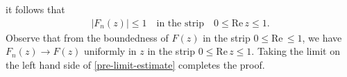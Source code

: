 \documentclass[12pt,reqno]{amsart}
\numberwithin{equation}{section}  %
\numberwithin{figure}{section}
\theoremstyle{plain}
\theoremstyle{definition}
\theoremstyle{remark}
\begin{document}
it follows that 
%
%
%
%
\begin{equation}
\label{pre-limit-estimate}
\begin{split}
	|F_n(z)| \le 1 \quad  \text{in the strip} \quad 0 \le \text{Re}\, z \le 1.
\end{split}
\end{equation}
Observe that from the boundedness of $F(z)$ in the strip $0 \le \text{Re}\, \le
1$, we have \\ $F_n(z) \to F(z)$ uniformly in $z$
in the strip $0 \le \text{Re}\, z\le 1$. Taking the
limit on the left hand side of \eqref{pre-limit-estimate} completes the proof.
\qquad \qedsymbol





\end{document}

